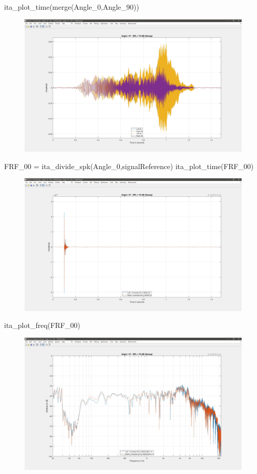 \documentclass[12pt, a4paper, twoside, onecolumn]{article}%
\begin{document}
\pagebreak
\begin{matlabbox}
ita_plot_time(merge(Angle_0,Angle_90))
\end{matlabbox}

\begin{figure}[H] \centering
\includegraphics[width=.7\textwidth]{Figures/E5.jpg}
\end{figure}


\begin{matlabbox}
FRF_00 = ita_divide_spk(Angle_0,signalReference) %
ita_plot_time(FRF_00)

\end{matlabbox}

\begin{figure}[H] \centering
\includegraphics[width=.7\textwidth]{Figures/E6.jpg}
\end{figure}

\pagebreak
\begin{matlabbox}
ita_plot_freq(FRF_00)
\end{matlabbox}
\begin{figure}[H] \centering
\includegraphics[width=.7\textwidth]{Figures/E7.jpg}
\end{figure}
\end{document}

